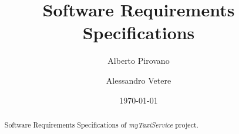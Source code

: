 \documentclass{article}      %
\title{Software Requirements Specifications}    %
\author{Alberto Pirovano \and Alessandro Vetere}      %
\date{\today}      %
\newcommand{\myTaxiService}[0]{\mbox{\emph{myTaxiService}}}
\newcommand{\sectionBaseDir}[1]{./section_#1} %
\newcommand{\sectionTexPath}[1]{\sectionBaseDir{#1}/section_#1.tex}
\newcommand{\inputSection}[1]{\newpage}}
\begin{document}
\maketitle
\begin{abstract} %
	Software Requirements Specifications of \myTaxiService{} project.
\end{abstract} %
\newpage
\tableofcontents             %
\inputSection{1}
\inputSection{2}
\inputSection{3}
\end{document}
